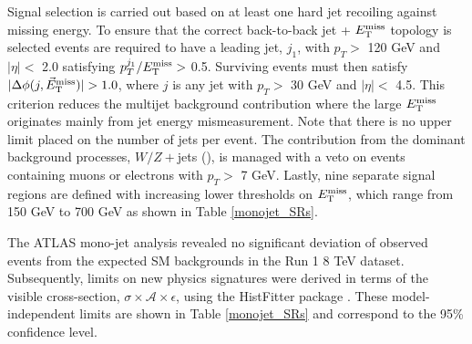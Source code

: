Signal selection is carried out based on at least one hard jet recoiling against missing energy. To ensure that the correct back-to-back jet + $E_{\mathrm{T}}^{\mathrm{miss}}$ topology is selected events are required to have a leading jet, $j_{1}$, with $p_{T} >$ 120 GeV and $|\eta| <$ 2.0 satisfying $p_{T}^{j_{1}}/E_{\mathrm{T}}^{\mathrm{miss}} >$ 0.5. Surviving events must then satisfy $|\Delta\phi(j,\metvec)|>1.0$, where $j$ is any jet with $p_{T} >$ 30 GeV and $|\eta| <$ 4.5. This criterion reduces the multijet background contribution where the large $E_{\mathrm{T}}^{\mathrm{miss}}$ originates mainly from jet energy mismeasurement. Note that there is no upper limit placed on the number of jets per event. The contribution from the dominant background processes, $W/Z+$jets (), is managed with a veto on events containing muons or electrons with $p_{T}>$ 7 GeV.  Lastly, nine separate signal regions are defined with increasing lower thresholds on $E_{\mathrm{T}}^{\mathrm{miss}}$, which range from 150 GeV to 700 GeV as shown in Table \ref{monojet_SRs}.

The ATLAS mono-jet analysis revealed no significant deviation of observed events from the expected SM backgrounds in the Run 1 8 TeV dataset. Subsequently, limits on new physics signatures were derived in terms of the visible cross-section, $\sigma\times\mathcal{A}\times\epsilon$, using the HistFitter package \cite{}. These model-independent limits are shown in Table \ref{monojet_SRs} and correspond to the 95\% confidence level.

